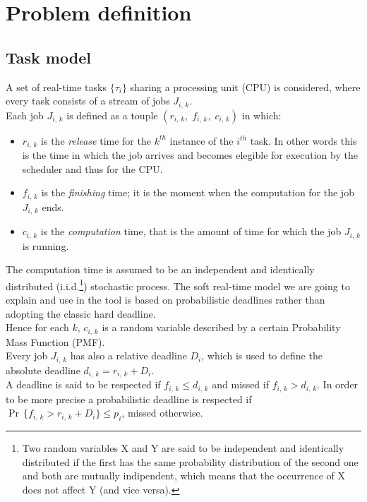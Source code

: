 \chapter{Problem definition}\label{chp:model}


\section{Task model}
A set of real-time tasks \( \{\tau_{i}\} \) sharing a processing unit (CPU) is considered, where every task consists of a stream of jobs \( J_{i,\,k} \).\\
Each job \( J_{i,\,k} \) is defined as a touple \( \left(r_{i,\,k}, \;f_{i,\,k}, \;c_{i,\,k}\right) \) in which:
\begin{itemize}
  \item \( r_{i,\,k} \) is the \emph{release} time for the \( k^{th} \) instance of the \( i^{th} \) task. In other words this is the time in which the job arrives and becomes elegible for execution by the scheduler and thus for the CPU.
  \item \( f_{i,\,k} \) is the \emph{finishing} time; it is the moment when the computation for the job \( J_{i,\,k} \) ends.
  \item \( c_{i,\,k} \) is the \emph{computation} time, that is the amount of time for which the job \( J_{i,\,k} \) is running.
\end{itemize} 

The computation time is assumed to be an independent and identically distributed (i.i.d.\footnote{Two random variables X and Y are said to be independent and identically distributed if the first has the same probability distribution of the second one and both are mutually indipendent, which means that the occurrence of X does not affect Y (and vice versa).}) stochastic process. The soft real-time model we are going to explain and use in the tool is based on probabilistic deadlines rather than adopting the classic hard deadline.\\
Hence for each \( k \), \( c_{i,\,k} \) is a random variable described by a certain Probability Mass Function (PMF).\\
Every job \( J_{i,\,k} \) has also a relative deadline \( D_{i} \), which is used to define the absolute deadline \( d_{i,\,k} = r_{i,\,k} + D_{i} \). \\
A deadline is said to be respected if \( f_{i,\,k} \leq d_{i,\,k} \) and missed if \( f_{i,\,k} > d_{i,\,k} \). In order to be more precise a probabilistic deadline is respected if \( \Pr\,\{f_{i,\,k} > r_{i,\,k} + D_{i} \} \leq p_{i} \), missed otherwise.

